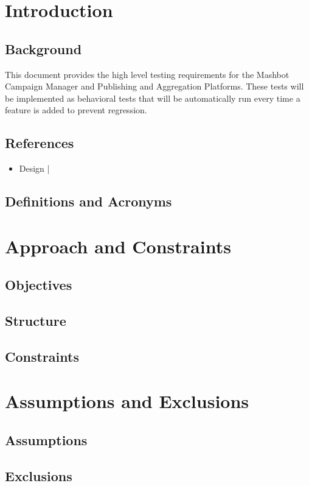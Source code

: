 \documentclass[12pt]{article}
\begin{document}
\section{Introduction}
\subsection{Background}
This document provides the high level testing requirements for the Mashbot Campaign Manager and Publishing and Aggregation Platforms.  These tests will be implemented as behavioral tests that will be automatically run every time a feature is added to prevent regression.
\subsection{References}
\begin{itemize}
  \item Design | 
\end{itemize}
\subsection{Definitions and Acronyms}

\section{Approach and Constraints}
\subsection{Objectives}
\subsection{Structure}
\subsection{Constraints}

\section{Assumptions and Exclusions}
\subsection{Assumptions}
\subsection{Exclusions}
\end{document}

